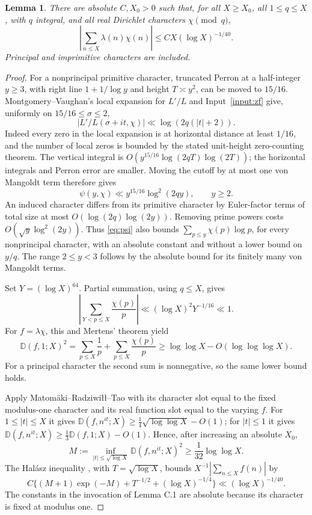 \documentclass[11pt]{article}
\newtheorem{lemma}[theorem]{Lemma}
\theoremstyle{definition}
\newcommand{\Dpret}{\mathbb D}
\newcommand{\abs}[1]{\left\lvert#1\right\rvert}
\begin{document}
\begin{lemma}\label{lem:realmean}
There are absolute $C,X_0>0$ such that, for all $X\ge X_0$, all
$1\le q\le X$, with $q$ integral, and all real Dirichlet characters $\chi\pmod q$,
\begin{equation}\label{eq:realmean}
 \abs{\sum_{n\le X}\lambda(n)\chi(n)}
 \le C X(\log X)^{-1/40}.
\end{equation}
Principal and imprimitive characters are included.
\end{lemma}
\begin{proof}
For a nonprincipal primitive character, truncated Perron at a half-integer
$y\ge3$, with right line $1+1/\log y$ and height $T\asymp y^2$,
can be moved to $15/16$.
Montgomery--Vaughan's local expansion for $L'/L$
\cite[Lemma 11.1 and Theorem 10.17]{MV} and
Input~\ref{input:zf} give, uniformly on $15/16\le\sigma\le2$,
\[
 \abs{L'/L(\sigma+it,\chi)}\ll\log(2q(|t|+2)).
\]
Indeed every zero in the local expansion is at horizontal distance at
least $1/16$, and the number of local zeros is bounded by the stated
unit-height zero-counting theorem. The vertical integral is
$O(y^{15/16}\log(2qT)\log(2T))$; the horizontal integrals and Perron
error are smaller. Moving the cutoff by at most one von Mangoldt term
therefore gives
\begin{equation}\label{eq:psi}
 \psi(y,\chi)\ll y^{15/16}\log^2(2qy),\qquad y\ge2.
\end{equation}
An induced character differs from its primitive character by Euler-factor
terms of total size at most $O(\log(2q)\log(2y))$.
Removing prime powers costs $O(\sqrt y\log^2(2y))$.
Thus \eqref{eq:psi} also bounds
$\sum_{p\le y}\chi(p)\log p$, for every nonprincipal character, with an
absolute constant and without a lower bound on $y/q$.
The range $2\le y<3$ follows by the absolute bound for its finitely many
von Mangoldt terms.

Set $Y=(\log X)^{64}$. Partial summation, using $q\le X$, gives
\[
 \abs{\sum_{Y<p\le X}\frac{\chi(p)}p}
 \ll (\log X)^2Y^{-1/16}\ll1.
\]
For $f=\lambda\chi$, this and Mertens' theorem yield
\[
 \Dpret(f,1;X)^2
 =\sum_{p\le X}\frac1p+\sum_{p\le X}\frac{\chi(p)}p
 \ge\log\log X-O(\log\log\log X).
\]
For a principal character the second sum is nonnegative, so the same
lower bound holds.

Apply Matom\"aki--Radziwi\l\l--Tao
\cite[Lemma C.1, corrected version 3]{MRT} with its character slot equal
to the fixed modulus-one character and its real function slot equal to
the varying $f$. For $1\le|t|\le X$ it gives
$\Dpret(f,n^{it};X)\ge\frac14\sqrt{\log\log X}-O(1)$; for $|t|\le1$
it gives $\Dpret(f,n^{it};X)\ge\frac13\Dpret(f,1;X)-O(1)$.
Hence, after increasing an absolute $X_0$,
\[
 M:=\inf_{|t|\le\sqrt{\log X}}\Dpret(f,n^{it};X)^2
 \ge\frac1{32}\log\log X.
\]
The Hal\'asz inequality \cite[Lemma 7.4, modulus 1]{KMT}, with
$T=\sqrt{\log X}$, bounds $X^{-1}|\sum_{n\le X}f(n)|$ by
\[
 C\{(M+1)\exp(-M)+T^{-1/2}+(\log X)^{-1/4}\}
 \ll(\log X)^{-1/40}.
\]
The constants in the invocation of Lemma C.1 are absolute because its
character is fixed at modulus one.
\end{proof}
\end{document}
